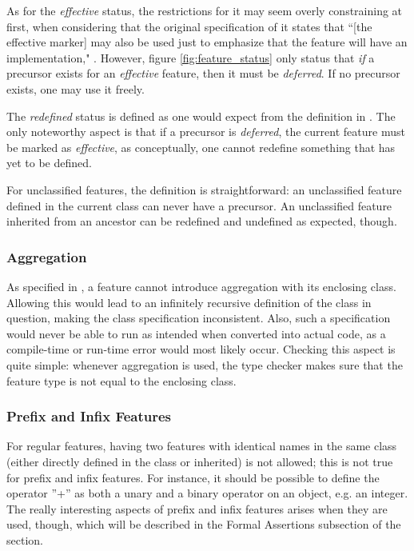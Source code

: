 As for the \textit{effective} status, the restrictions for it may seem overly constraining at first, when considering that the original specification of it states that ``[the effective marker] may also be used just to emphasize that the feature will have an implementation," \cite[p.~40]{walden1995}. However, figure \ref{fig:feature_status} only status that \emph{if} a precursor exists for an \textit{effective} feature, then it must be \textit{deferred}. If no precursor exists, one may use it freely.

The \textit{redefined} status is defined as one would expect from the definition in \cite[p.~40]{walden1995}. The only noteworthy aspect is that if a precursor is \textit{deferred}, the current feature must be marked as \textit{effective}, as conceptually, one cannot redefine something that has yet to be defined.

For unclassified features, the definition is straightforward: an unclassified feature defined in the current class can never have a precursor. An unclassified feature inherited from an ancestor can be redefined and undefined as expected, though.
\subsubsection{Aggregation}
As specified in \cite{ostroff2001}, a feature cannot introduce aggregation with its enclosing class. Allowing this would lead to an infinitely recursive definition of the class in question, making the class specification inconsistent. Also, such a specification would never be able to run as intended when converted into actual code, as a compile-time or run-time error would most likely occur. Checking this aspect is quite simple: whenever aggregation is used, the type checker makes sure that the feature type is not equal to the enclosing class.
\subsubsection{Prefix and Infix Features}
For regular features, having two features with identical names in the same class (either directly defined in the class or inherited) is not allowed; this is not true for prefix and infix features. For instance, it should be possible to define the operator ''+'' as both a unary and a binary operator on an object, e.g. an integer. The really interesting aspects of prefix and infix features arises when they are used, though, which will be described in the Formal Assertions subsection of the section.

